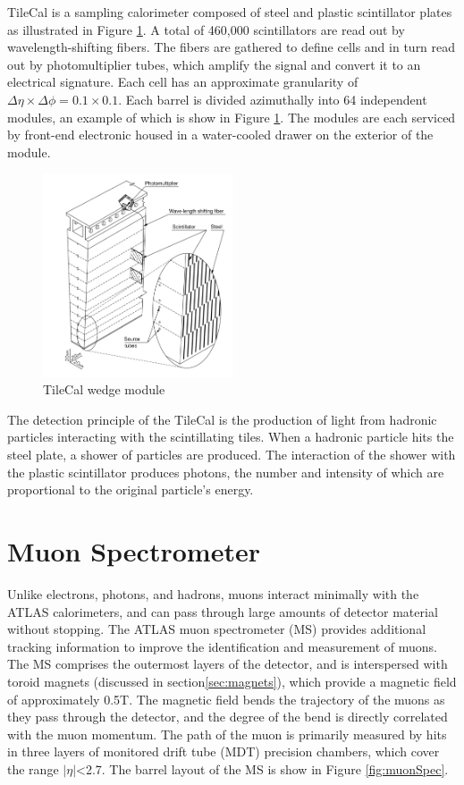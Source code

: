 TileCal is a sampling calorimeter composed of steel and plastic scintillator plates as illustrated in Figure \ref{fig:tileCal}. A total of 460,000 scintillators are read out by wavelength-shifting fibers. The fibers are gathered to define cells and in turn read out by photomultiplier tubes, which amplify the signal and convert it to an electrical signature. Each cell has an approximate granularity of $\Delta\eta \times \Delta\phi = 0.1 \times 0.1$. Each barrel is divided azimuthally into 64 independent modules, an example of which is show in Figure \ref{fig:tileCal}. The modules are each serviced by front-end electronic housed in a water-cooled drawer on the exterior of the module. \\

\begin{figure}
        \centering
	\includegraphics[width=0.5\textwidth]{figures/ch3/tileWedge.png}
	\caption{TileCal wedge module \cite{tile_tdr} }
	\label{fig:tileCal}
\end{figure}

The detection principle of the TileCal is the production of light from hadronic particles interacting with the scintillating tiles. When a hadronic particle hits the steel plate, a shower of particles are produced. The interaction of the shower with the plastic scintillator produces photons, the number and intensity of which are proportional to the original particle's energy. \\

\section{Muon Spectrometer}
Unlike electrons, photons, and hadrons, muons interact minimally with the ATLAS calorimeters, and can pass through large amounts of detector material without stopping. The ATLAS muon spectrometer (MS) provides additional tracking information to improve the identification and measurement of muons. The MS comprises the outermost layers of the detector, and is interspersed with toroid magnets (discussed in section\ref{sec:magnets}), which provide a magnetic field of approximately 0.5T. The magnetic field bends the trajectory of the muons as they pass through the detector, and the degree of the bend is directly correlated with the muon momentum. The path of the muon is primarily measured by hits in three layers of monitored drift tube (MDT) precision chambers, which cover the range $|\eta|$<2.7. The barrel layout of the MS is show in Figure \ref{fig:muonSpec}. \\

